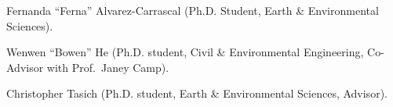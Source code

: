 \item Fernanda ``Ferna'' Alvarez-Carrascal (Ph.D. Student, Earth \& Environmental Sciences).
\item Wenwen ``Bowen'' He (Ph.D. student, Civil \& Environmental Engineering, Co-Advisor with Prof.\ Janey Camp).
\item Christopher Tasich (Ph.D. student, Earth \& Environmental Sciences, Advisor).
